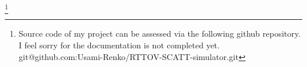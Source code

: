 \documentclass[a4paper]{report}
\begin{document}




\tableofcontents
\thispagestyle{empty}
\setcounter{page}{0}







\footnote{Source code of my project can be assessed via the following github repository. I feel sorry for the documentation is not completed yet.
git@github.com:Usami-Renko/RTTOV-SCATT-simulator.git}
\end{document}
